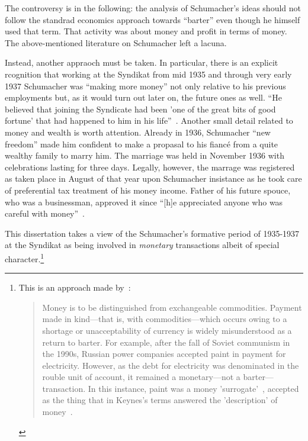 The controversy is in the following: the analysis of Schumacher's ideas should not follow the standrad economics approach towards ``barter'' even though he himself used that term. That activity was about money and profit in terms of money. The above-mentioned literature on Schumacher left a lacuna.  

Instead, another appraoch must be taken. In particular, there is an explicit rcognition that working at the Syndikat from mid 1935 and through very early 1937 Schumacher was ``making more money'' not only relative to his previous employments but, as it would turn out later on, the future ones as well. ``He believed that joining the Syndicate had been 'one of the great bits of good fortune' that had happened to him in his life''~\cite[p.~85]{wood1984}. Another small detail related to money and wealth is worth attention. Already in 1936, Schumacher ``new freedom'' made him confident to make a propasal to his fianc{\'e} from a quite wealthy family to marry him. The marriage was held in November 1936 with celebrations lasting for three days. Legally, however, the marrage was registered as taken place in August of that year upon Schumacher insistance as he took care of preferential tax treatment of his money income. Father of his future spouce, who was a businessman, approved it since ``[h]e appreciated anyone who was careful with money''~\cite[p.~81]{wood1984}.

This dissertation takes a view of the Schumacher's formative period of 1935-1937 at the Syndikat as being involved in \textit{monetary} transactions albeit of special character.\footnote{This is an approach made by~\cite{ingham2020}:
\begin{quote}
Money is to be distinguished from exchangeable commodities. Payment made in kind---that is, with commodities---which occurs owing to a shortage or unacceptability of currency is widely misunderstood as a return to barter. For example, after the fall of Soviet communism in the 1990s, Russian power companies accepted paint in payment for electricity. However, as the debt for electricity was denominated in the rouble unit of account, it remained a monetary---not a barter---transaction. In this instance, paint was a money 'surrogate'~\citep{woodruff2013}, accepted as the thing that in Keynes's terms answered the 'description' of money~\citep[p.4, see chapter 6]{keynes1930}.~\citep[p.~40]{ingham2020}
\end{quote}
}

